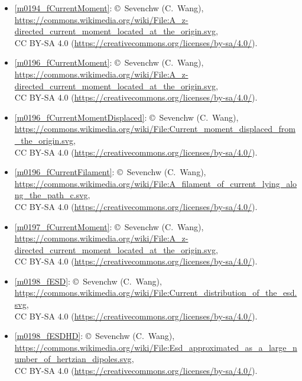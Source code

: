 \begin{itemize}

\item[Fig.] \label{m0194_fCurrentMoment_Credit}
  \ref{m0194_fCurrentMoment}:
  \copyright~Sevenchw (C.\ Wang), 
  \url{https://commons.wikimedia.org/wiki/File:A_z-directed_current_moment_located_at_the_origin.svg},\\ 
  CC BY-SA 4.0 (\url{https://creativecommons.org/licenses/by-sa/4.0/}).

\item[Fig.] \label{m0196_fCurrentMoment_Credit}
  \ref{m0196_fCurrentMoment}:
  \copyright~Sevenchw (C.\ Wang), 
  \url{https://commons.wikimedia.org/wiki/File:A_z-directed_current_moment_located_at_the_origin.svg},\\ 
  CC BY-SA 4.0 (\url{https://creativecommons.org/licenses/by-sa/4.0/}).

\item[Fig.] \label{m0196_fCurrentMomentDisplaced_Credit}
  \ref{m0196_fCurrentMomentDisplaced}:
  \copyright~Sevenchw (C.\ Wang), 
  \url{https://commons.wikimedia.org/wiki/File:Current_moment_displaced_from_the_origin.svg},\\ 
  CC BY-SA 4.0 (\url{https://creativecommons.org/licenses/by-sa/4.0/}).

\item[Fig.] \label{m0196_fCurrentFilament_Credit}
  \ref{m0196_fCurrentFilament}:
  \copyright~Sevenchw (C.\ Wang), 
  \url{https://commons.wikimedia.org/wiki/File:A_filament_of_current_lying_along_the_path_c.svg},\\ 
  CC BY-SA 4.0 (\url{https://creativecommons.org/licenses/by-sa/4.0/}).

\item[Fig.] \label{m0197_fCurrentMoment_Credit}
  \ref{m0197_fCurrentMoment}:
  \copyright~Sevenchw (C.\ Wang), 
  \url{https://commons.wikimedia.org/wiki/File:A_z-directed_current_moment_located_at_the_origin.svg},\\ 
  CC BY-SA 4.0 (\url{https://creativecommons.org/licenses/by-sa/4.0/}).

\item[Fig.] \label{m0198_fESD_Credit}
  \ref{m0198_fESD}:
  \copyright~Sevenchw (C.\ Wang), 
  \url{https://commons.wikimedia.org/wiki/File:Current_distribution_of_the_esd.svg},\\ 
  CC BY-SA 4.0 (\url{https://creativecommons.org/licenses/by-sa/4.0/}).

\item[Fig.] \label{m0198_fESDHD_Credit}
  \ref{m0198_fESDHD}:
  \copyright~Sevenchw (C.\ Wang), 
  \url{https://commons.wikimedia.org/wiki/File:Esd_approximated_as_a_large_number_of_hertzian_dipoles.svg},\\ 
  CC BY-SA 4.0 (\url{https://creativecommons.org/licenses/by-sa/4.0/}).


\end{itemize}
